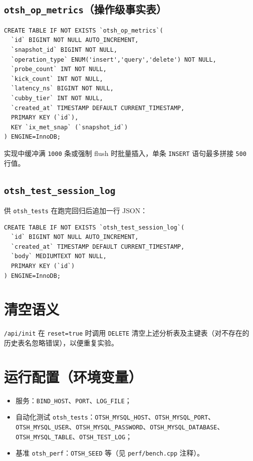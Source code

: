 \subsection{\texttt{otsh\_op\_metrics}（操作级事实表）}
\begin{verbatim}
CREATE TABLE IF NOT EXISTS `otsh_op_metrics`(
  `id` BIGINT NOT NULL AUTO_INCREMENT,
  `snapshot_id` BIGINT NOT NULL,
  `operation_type` ENUM('insert','query','delete') NOT NULL,
  `probe_count` INT NOT NULL,
  `kick_count` INT NOT NULL,
  `latency_ns` BIGINT NOT NULL,
  `cubby_tier` INT NOT NULL,
  `created_at` TIMESTAMP DEFAULT CURRENT_TIMESTAMP,
  PRIMARY KEY (`id`),
  KEY `ix_met_snap` (`snapshot_id`)
) ENGINE=InnoDB;
\end{verbatim}
实现中缓冲满 \texttt{1000} 条或强制 flush 时批量插入，单条 \texttt{INSERT} 语句最多拼接 \texttt{500} 行值。

\subsection{\texttt{otsh\_test\_session\_log}}
供 \texttt{otsh\_tests} 在跑完回归后追加一行 JSON：
\begin{verbatim}
CREATE TABLE IF NOT EXISTS `otsh_test_session_log`(
  `id` BIGINT NOT NULL AUTO_INCREMENT,
  `created_at` TIMESTAMP DEFAULT CURRENT_TIMESTAMP,
  `body` MEDIUMTEXT NOT NULL,
  PRIMARY KEY (`id`)
) ENGINE=InnoDB;
\end{verbatim}

\section{清空语义}
\texttt{/api/init} 在 \texttt{reset=true} 时调用 \texttt{DELETE} 清空上述分析表及主键表（对不存在的历史表名忽略错误），以便重复实验。

\section{运行配置（环境变量）}
\begin{itemize}
  \item 服务：\texttt{BIND\_HOST}、\texttt{PORT}、\texttt{LOG\_FILE}；
  \item 自动化测试 \texttt{otsh\_tests}：\texttt{OTSH\_MYSQL\_HOST}、\texttt{OTSH\_MYSQL\_PORT}、\texttt{OTSH\_MYSQL\_USER}、\texttt{OTSH\_MYSQL\_PASSWORD}、\texttt{OTSH\_MYSQL\_DATABASE}、\texttt{OTSH\_MYSQL\_TABLE}、\texttt{OTSH\_TEST\_LOG}；
  \item 基准 \texttt{otsh\_perf}：\texttt{OTSH\_SEED} 等（见 \texttt{perf/bench.cpp} 注释）。
\end{itemize}
